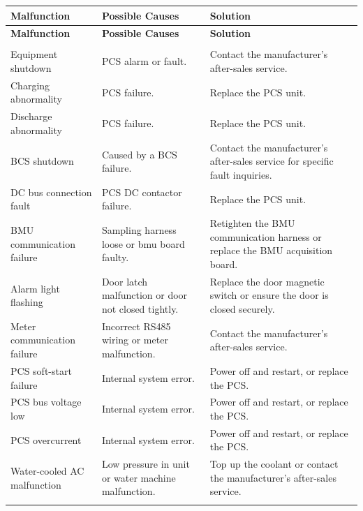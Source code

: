 \documentclass[11pt, a4paper]{article}
\newcommand{\sffont}{\sffamily\fontseries{b}\selectfont}
\begin{document}
\begin{xltabular}{\textwidth}{>{\sffont\raggedright\arraybackslash}X >{\raggedright\arraybackslash}X >{\raggedright\arraybackslash}X}
\toprule
\textbf{Malfunction} & \textbf{Possible Causes} & \textbf{Solution} \\
\midrule
\endfirsthead %

\toprule
\textbf{Malfunction} & \textbf{Possible Causes} & \textbf{Solution} \\
\midrule
\endhead %

\midrule
{} \\
\endfoot %

\bottomrule
\endlastfoot %

Equipment shutdown & PCS alarm or fault. & Contact the manufacturer's after-sales service. \\ \addlinespace
Charging abnormality & PCS failure. & Replace the PCS unit. \\ \addlinespace
Discharge abnormality & PCS failure. & Replace the PCS unit. \\ \addlinespace
BCS shutdown & Caused by a BCS failure. & Contact the manufacturer's after-sales service for specific fault inquiries. \\ \addlinespace
DC bus connection fault & PCS DC contactor failure. & Replace the PCS unit. \\ \addlinespace
BMU communication failure & Sampling harness loose or \gls{bmu} board faulty. & Retighten the BMU communication harness or replace the BMU acquisition board. \\ \addlinespace
Alarm light flashing & Door latch malfunction or door not closed tightly. & Replace the door magnetic switch or ensure the door is closed securely. \\ \addlinespace
Meter communication failure & Incorrect RS485 wiring or meter malfunction. & Contact the manufacturer's after-sales service. \\ \addlinespace
PCS soft-start failure & Internal system error. & Power off and restart, or replace the PCS. \\ \addlinespace
PCS bus voltage low & Internal system error. & Power off and restart, or replace the PCS. \\ \addlinespace
PCS overcurrent & Internal system error. & Power off and restart, or replace the PCS. \\ \addlinespace
Water-cooled AC malfunction & Low pressure in unit or water machine malfunction. & Top up the coolant or contact the manufacturer's after-sales service. \\ \addlinespace

\end{xltabular}
\end{document}

